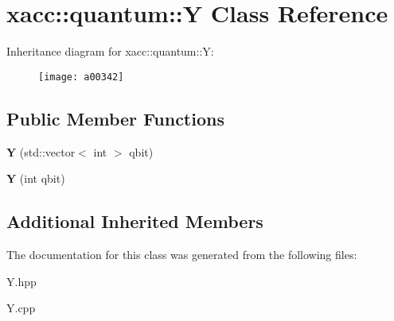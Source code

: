 \hypertarget{a00342}{}\section{xacc\+:\+:quantum\+:\+:Y Class Reference}
\label{a00342}
Inheritance diagram for xacc\+:\+:quantum\+:\+:Y\+:\begin{figure}[H]
\begin{center}
\leavevmode
\texttt{[image: a00342]}
\end{center}
\end{figure}
\subsection*{Public Member Functions}
\begin{DoxyCompactItemize}
\item 
{\bfseries Y} (std\+::vector$<$ int $>$ qbit)\hypertarget{a00342_a7959be0aa8221c0b1ba445771f5ecf0a}{}\label{a00342_a7959be0aa8221c0b1ba445771f5ecf0a}

\item 
{\bfseries Y} (int qbit)\hypertarget{a00342_aea2b37ac45208cbf6a47e0074e4a9653}{}\label{a00342_aea2b37ac45208cbf6a47e0074e4a9653}

\end{DoxyCompactItemize}
\subsection*{Additional Inherited Members}


The documentation for this class was generated from the following files\+:\begin{DoxyCompactItemize}
\item 
Y.\+hpp\item 
Y.\+cpp\end{DoxyCompactItemize}
